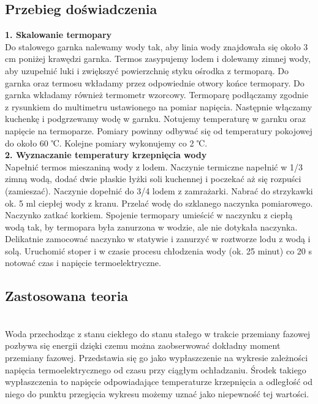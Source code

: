 \documentclass[11pt]{article}
\begin{document}
    \subsection*{Przebieg doświadczenia}
    \textbf{1. Skalowanie termopary}\\
    \indent Do stalowego garnka nalewamy wody tak, aby
    linia wody znajdowała się około 3 cm poniżej
    krawędzi garnka. Termos zasypujemy lodem i
    dolewamy zimnej wody, aby uzupełnić luki i
    zwiększyć powierzchnię styku ośrodka z
    termoparą. Do garnka oraz termosu wkładamy
    przez odpowiednie otwory końce termopary.
    Do garnka wkładamy również termometr
    wzorcowy. Termoparę podłączamy zgodnie z
    rysunkiem do multimetru ustawionego na
    pomiar napięcia. Następnie włączamy kuchenkę
    i podgrzewamy wodę w garnku. Notujemy
    temperaturę w garnku oraz napięcie na
    termoparze. Pomiary powinny odbywać się od
    temperatury pokojowej do około 60 ℃. Kolejne
    pomiary wykonujemy co 2 ℃.\\
    \newpage
    \noindent\textbf{2. Wyznaczanie temperatury krzepnięcia wody}\\
    \indent Napełnić termos mieszaniną wody z lodem. Naczynie termiczne napełnić w 1/3 zimną wodą, dodać
    dwie płaskie łyżki soli kuchennej i poczekać aż się rozpuści (zamieszać). Naczynie dopełnić do 3/4 lodem
    z zamrażarki. Nabrać do strzykawki ok. 5 ml ciepłej wody z kranu. Przelać wodę do szklanego naczynka
    pomiarowego. Naczynko zatkać korkiem. Spojenie termopary umieścić w naczynku z ciepłą wodą tak,
    by termopara była zanurzona w wodzie, ale nie dotykała naczynka. Delikatnie zamocować naczynko w
    statywie i zanurzyć w roztworze lodu z wodą i solą. Uruchomić stoper i w czasie procesu chłodzenia
    wody (ok. 25 minut) co 20 s notować czas i napięcie termoelektryczne.

    \subsection*{Zastosowana teoria}\\
    \indent Woda przechodząc z stanu ciekłego do stanu stałego w trakcie
    przemiany fazowej pozbywa się energii dzięki czemu można
    zaobserwować dokładny moment przemiany fazowej.
    Przedstawia się go jako wypłaszczenie na wykresie zależności
    napięcia termoelektrycznego od czasu przy ciągłym
    ochładzaniu. Środek takiego wypłaszczenia to napięcie
    odpowiadające temperaturze krzepnięcia a odległość od
    niego do punktu przegięcia wykresu możemy uznać jako
    niepewność tej wartości.\\
\end{document}

